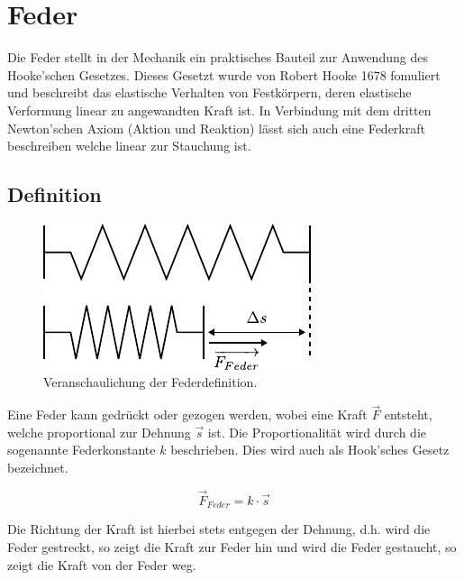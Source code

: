 \chapter{Feder}

Die Feder stellt in der Mechanik ein praktisches Bauteil zur Anwendung
des Hooke'schen Gesetzes. Dieses Gesetzt wurde von Robert Hooke 1678 
fomuliert und beschreibt das elastische Verhalten von Festkörpern,
deren elastische Verformung linear zu angewandten Kraft ist. 
In Verbindung mit dem dritten Newton'schen Axiom (Aktion und Reaktion) 
lässt sich auch eine Federkraft beschreiben welche linear zur Stauchung
ist.

\newpage
\section{Definition}

\begin{figure}[h!]
	\centering
	\includegraphics[scale=0.75]{../fig/feder-dehnung.pdf}
	\caption{Veranschaulichung der Federdefinition.}
	\label{fig:feder-dehnung}
\end{figure}

\noindent
Eine Feder kann gedrückt oder gezogen werden, wobei eine Kraft $\vec{F}$ 
entsteht, welche proportional zur Dehnung $\vec{s}$ ist. 
Die Proportionalität wird durch die sogenannte Federkonstante $k$ 
beschrieben. Dies wird auch als Hook'sches Gesetz bezeichnet.

\[ \boxed{\vec{F}_{Feder} = k \cdot \vec{s}} \]

\noindent
Die Richtung der Kraft ist hierbei stets entgegen der Dehnung, d.h. wird die
Feder gestreckt, so zeigt die Kraft zur Feder hin und wird die Feder
gestaucht, so zeigt die Kraft von der Feder weg.

